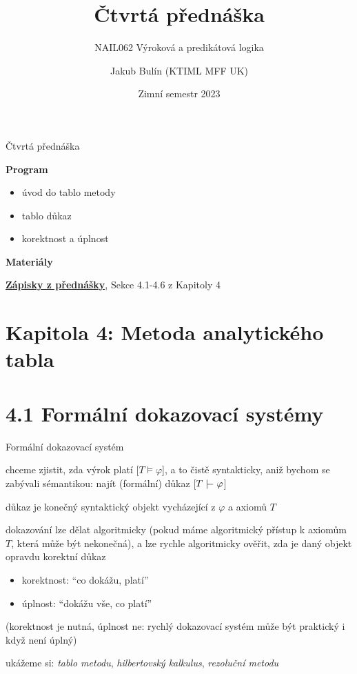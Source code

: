 \documentclass{beamer}
\title{Čtvrtá přednáška}
\subtitle{NAIL062 Výroková a predikátová logika}
\author{Jakub Bulín (KTIML MFF UK)}
\date{Zimní semestr 2023}
\begin{document}
\maketitle


\begin{frame}{Čtvrtá přednáška}

    \textbf{Program}
        \begin{itemize}
            \item úvod do tablo metody
            \item tablo důkaz
            \item korektnost a úplnost
        \end{itemize}

    \textbf{Materiály}

        \href{https://github.com/jbulin-mff-uk/nail062/raw/main/lecture/lecture-notes/lecture-notes.pdf}{\alert{\textbf{Zápisky z přednášky}}}, Sekce 4.1-4.6 z Kapitoly 4

\end{frame}


\section{\sc Kapitola 4: Metoda analytického tabla}


\section{4.1 Formální dokazovací systémy}


\begin{frame}{Formální dokazovací systém}

    chceme zjistit, zda výrok platí [\alert{$T\models\varphi$}], a to čistě syntakticky, aniž bychom se zabývali sémantikou: najít \alert{(formální) důkaz} [\alert{$T\proves\varphi$}]

    \alert{důkaz} je konečný syntaktický objekt vycházející z $\varphi$ a axiomů $T$

    dokazování lze dělat \alert{algoritmicky} (pokud máme algoritmický přístup k axiomům $T$, která může být nekonečná), a lze rychle algoritmicky \alert{ověřit}, zda je daný objekt opravdu korektní důkaz

    \begin{itemize}
        \item \alert{korektnost}: ``co dokážu, platí'' \hfill {}
        \item \alert{úplnost}: ``dokážu vše, co platí'' \hfill {}
    \end{itemize}
    (korektnost je nutná, úplnost ne: rychlý dokazovací systém může být praktický i když není úplný)

    ukážeme si: \emph{tablo metodu}, \emph{hilbertovský kalkulus}, \emph{rezoluční metodu}
    

\end{frame}
\end{document}
